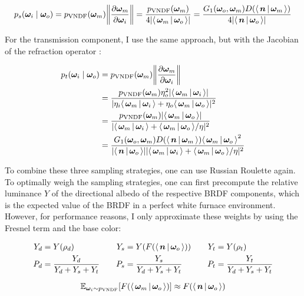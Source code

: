 \begin{equation}
    p_s(\wi \mid \wo) = p_\mathrm{VNDF}(\wm) \left\|\frac{\partial \wm}{\partial \wi}\right\| =  \frac{p_\mathrm{VNDF}(\wm)}{4|\VdotH|} = \frac{G_1(\wo, \wm) D(\NdotH)}{4|\NdotV|}
\end{equation}

For the transmission component, I use the same approach, but with the Jacobian of the refraction operator :

\begin{equation}
    \begin{aligned}
        p_t(\wi \mid \wo)
        &= p_\mathrm{VNDF}(\wm) \left\|\frac{\partial \wm}{\partial \wi}\right\| \\
        &= \frac{p_\mathrm{VNDF}(\wm) \eta_o^2 |\LdotH|}{|\eta_i \LdotH + \eta_o \VdotH|^2} \\
        &= \frac{p_\mathrm{VNDF}(\wm) |\VdotH|}{|\LdotH + \VdotH / \eta|^2} \\
        &= \frac{G_1(\wo, \wm) D(\NdotH) \VdotH^2 }{|\NdotV| |\LdotH + \VdotH / \eta|^2}
    \end{aligned}
\end{equation}

To combine these three sampling strategies, one can use Russian Roulette again.
To optimally weigh the sampling strategies, one can first precompute the relative luminance $Y$ of the directional albedo of the respective BRDF components, which is the expected value of the BRDF in a perfect white furnace environment.
However, for performance reasons, I only approximate these weights by using the Fresnel term and the base color:

\begin{equation}
    \begin{aligned}
        Y_d &= Y(\rho_d) &\quad
        Y_s &= Y(F(\NdotV)) &\quad
        Y_t &= Y(\rho_t) \\
        P_d &= \frac{Y_d}{Y_d + Y_s + Y_t} &\quad
        P_s &= \frac{Y_s}{Y_d + Y_s + Y_t} &\quad
        P_t &= \frac{Y_t}{Y_d + Y_s + Y_t} \\
    \end{aligned}
\end{equation}

\begin{equation}
    \expectationvar{\wi \sim p_\mathrm{VNDF}}{F(\VdotH)} \approx F(\NdotV)
\end{equation}

